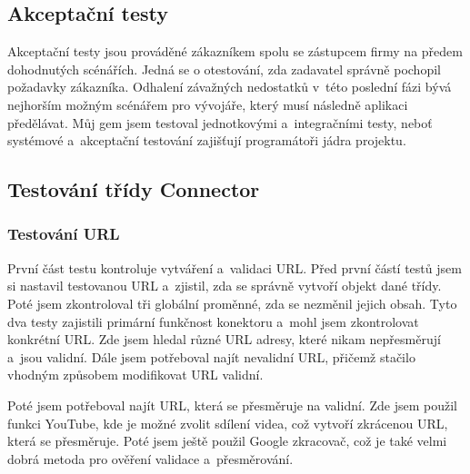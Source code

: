 \subsection{Akceptační testy}
\par Akceptační testy jsou prováděné zákazníkem spolu se zástupcem firmy na předem dohodnutých scénářích. Jedná se o otestování, zda zadavatel správně pochopil požadavky zákazníka. Odhalení závažných nedostatků v~této poslední fázi bývá nejhorším možným scénářem pro vývojáře, který musí následně aplikaci předělávat. Můj gem jsem testoval jednotkovými a~integračními testy, neboť systémové a~akceptační testování zajišťují programátoři jádra projektu.


\subsection{Testování třídy Connector}
\subsubsection{Testování URL}
\par První část testu kontroluje vytváření a~validaci URL. Před první částí testů jsem si nastavil testovanou URL a~zjistil, zda se správně vytvoří objekt dané třídy. Poté jsem zkontroloval tři globální proměnné, zda se nezměnil jejich obsah. Tyto dva testy zajistili primární funkčnost konektoru a~mohl jsem zkontrolovat konkrétní URL. Zde jsem hledal různé URL adresy, které nikam nepřesměrují a~jsou validní. Dále jsem potřeboval najít nevalidní URL, přičemž stačilo vhodným způsobem modifikovat URL validní. 
\par Poté jsem potřeboval najít URL, která se přesměruje na validní. Zde jsem použil funkci YouTube, kde je možné zvolit sdílení videa, což vytvoří zkrácenou URL, která se přesměruje. Poté jsem ještě použil Google zkracovač, což je také velmi dobrá metoda pro ověření validace a~přesměrování.

